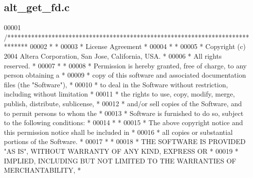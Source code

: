 \subsection{alt\+\_\+get\+\_\+fd.\+c}
\label{alt__get__fd_8c_source}

\begin{DoxyCode}
00001 \textcolor{comment}{/******************************************************************************}
00002 \textcolor{comment}{*                                                                             *}
00003 \textcolor{comment}{* License Agreement                                                           *}
00004 \textcolor{comment}{*                                                                             *}
00005 \textcolor{comment}{* Copyright (c) 2004 Altera Corporation, San Jose, California, USA.           *}
00006 \textcolor{comment}{* All rights reserved.                                                        *}
00007 \textcolor{comment}{*                                                                             *}
00008 \textcolor{comment}{* Permission is hereby granted, free of charge, to any person obtaining a     *}
00009 \textcolor{comment}{* copy of this software and associated documentation files (the "Software"),  *}
00010 \textcolor{comment}{* to deal in the Software without restriction, including without limitation   *}
00011 \textcolor{comment}{* the rights to use, copy, modify, merge, publish, distribute, sublicense,    *}
00012 \textcolor{comment}{* and/or sell copies of the Software, and to permit persons to whom the       *}
00013 \textcolor{comment}{* Software is furnished to do so, subject to the following conditions:        *}
00014 \textcolor{comment}{*                                                                             *}
00015 \textcolor{comment}{* The above copyright notice and this permission notice shall be included in  *}
00016 \textcolor{comment}{* all copies or substantial portions of the Software.                         *}
00017 \textcolor{comment}{*                                                                             *}
00018 \textcolor{comment}{* THE SOFTWARE IS PROVIDED "AS IS", WITHOUT WARRANTY OF ANY KIND, EXPRESS OR  *}
00019 \textcolor{comment}{* IMPLIED, INCLUDING BUT NOT LIMITED TO THE WARRANTIES OF MERCHANTABILITY,    *}

\end{DoxyCode}

